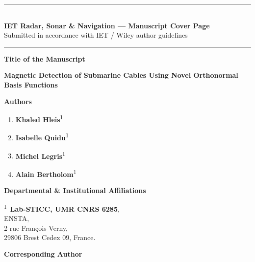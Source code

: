 

\noindent
{\color{ietblue}\rule{\linewidth}{2pt}}\\[4pt]
{\large\bfseries\color{ietblue} IET Radar, Sonar \& Navigation — Manuscript Cover Page}\\
{\small\color{sectiongray} Submitted in accordance with IET / Wiley author guidelines}\\[-2pt]
{\color{ietblue}\rule{\linewidth}{2pt}}
 
\vspace{1.2cm}
 
\textbf{ \color{ietblue} Title of the Manuscript}
 
\textbf{Magnetic Detection of Submarine Cables Using Novel Orthonormal Basis Functions}

\vspace{0.8cm}
 
\textbf{ \color{ietblue} {Authors}}
 
\begin{enumerate}
  \item \textbf{Khaled Hleis}\textsuperscript{1}
  \item \textbf{Isabelle Quidu}\textsuperscript{1}
  \item \textbf{Michel Legris}\textsuperscript{1}
  \item \textbf{Alain Bertholom}\textsuperscript{1}
\end{enumerate}
 
\vspace{0.8cm}
 
\textbf{ \color{ietblue} {Departmental \& Institutional Affiliations}}
 
\textsuperscript{1}~\textbf{Lab-STICC, UMR CNRS 6285},\\
ENSTA,\\
2 rue François Verny,\\
29806 Brest Cedex 09, France.
 
\vspace{0.8cm}
 
\textbf{ \color{ietblue} {Corresponding Author}}
 
